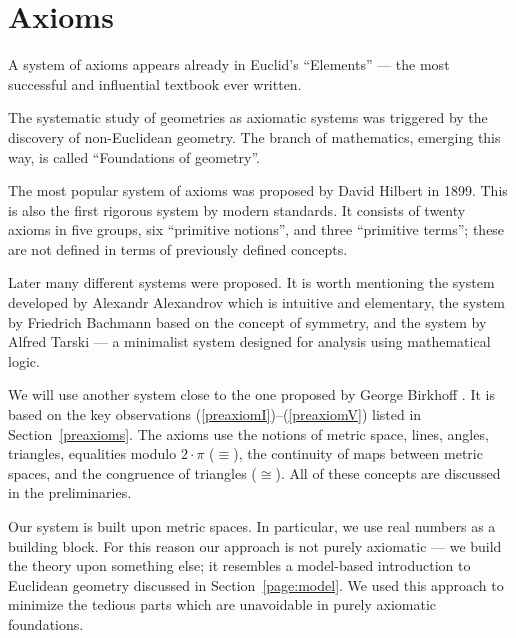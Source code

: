   
\chapter{Axioms}
\label{chap:axioms}

\vfill

A system of axioms appears already in Euclid's ``Elements'' --- the most successful and influential textbook ever written.

The systematic study of geometries as axiomatic systems
 was
triggered by the discovery of non-Euclidean geometry.
The branch of mathematics, emerging this way, is called ``Foundations of geometry''.

The most popular system of axioms
was proposed by David Hilbert in 1899.
This is also the first rigorous system by modern standards.
It consists of twenty axioms in five groups, six ``primitive notions'', and three ``primitive terms'';
these are not defined in terms of previously defined concepts.

Later many different systems were proposed.
It is worth mentioning
the system developed by Alexandr Alexandrov \cite{alexandrov} which is intuitive and elementary, 
the system by Friedrich Bachmann \cite{bachmann} based on the concept of symmetry,
and the system by Alfred Tarski \cite{tarski} --- a minimalist system designed for analysis using mathematical logic.

We will use another system close to the one proposed by George Birkhoff \cite{birkhoff}.
It is based on the key observations (\ref{preaxiomI})--(\ref{preaxiomV}) listed in Section~\ref{preaxioms}.
The axioms use the notions of 
metric space, 
lines, 
angles,
triangles,
equalities modulo $2\cdot\pi$ ($\equiv$), 
the continuity of maps between metric spaces,
and the congruence of triangles ($\cong$).
All of these concepts are discussed in the preliminaries.

Our system is built upon metric spaces.
In particular, we use real numbers as a building block. 
For this reason our approach is not purely axiomatic --- we build the theory upon something else;
it resembles a model-based introduction to Euclidean geometry discussed in Section~\ref{page:model}.
We used this approach to minimize the tedious parts which are unavoidable in purely axiomatic foundations.

